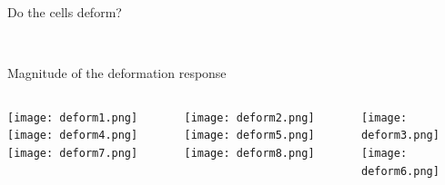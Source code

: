 
\begin{frame}[c]{Do the cells deform?}

	 \\

	
\end{frame}


\begin{frame}[c]{Magnitude of the deformation response}

	\begin{columns}[t]
		\begin{column}[T]{1.3in}
			\texttt{[image: deform1.png]}
			\texttt{[image: deform4.png]}
			\texttt{[image: deform7.png]}
		\end{column}
		
		\begin{column}[T]{1.3in}
			\texttt{[image: deform2.png]}
			\texttt{[image: deform5.png]}
			\texttt{[image: deform8.png]}
		\end{column}
		
		\begin{column}[T]{1.3in}
			\texttt{[image: deform3.png]}
			\texttt{[image: deform6.png]}
		\end{column}

	\end{columns}

	
\end{frame}



